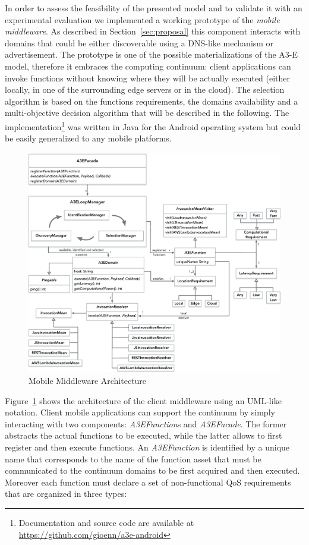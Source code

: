 In order to assess the feasibility of the presented model and to validate it with an experimental evaluation we implemented a working prototype of the \textit{mobile middleware}. As described in Section~\ref{sec:proposal} this component interacts with  domains that could be either discoverable using a DNS-like mechanism or advertisement. The prototype is one of the possible materializations of the A3-E model, therefore it embraces the computing continuum: client applications can invoke functions without knowing where they will be actually executed (either locally, in one of the surrounding edge servers or in the cloud). The selection algorithm is based on the functions requirements, the domains availability and a multi-objective decision algorithm that will be described in the following. The implementation\footnote{Documentation and source code are available at \url{https://github.com/gioenn/a3e-android}} was written in Java for the Android operating system but could be easily generalized to any mobile platforms. 
\begin{figure}[tbp]
	\includegraphics[width=1\textwidth]{figs/a3e-mobile-prototype}
	\caption{Mobile Middleware Architecture}
	\label{fig:mobile-prototype}
\end{figure}

Figure~\ref{fig:mobile-prototype} shows the architecture of the client middleware using an UML-like notation. Client mobile applications can support the continuum by simply interacting with two components:  \textit{A3EFunction}s and \textit{A3EFacade}. The former abstracts the actual functions to be executed, while the latter allows to first register and then execute functions. An \textit{A3EFunction} is identified by a unique name that corresponds to the name of the function asset that must be communicated to the continuum domains to be first acquired and then executed. Moreover each function must declare a set of non-functional QoS requirements that are organized in three types: 

